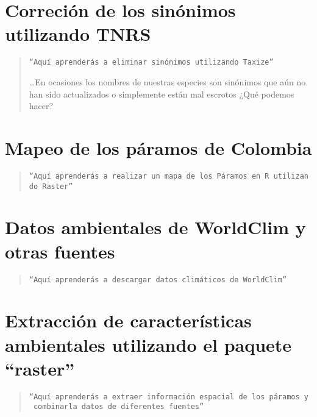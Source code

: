 \documentclass[
]{book}
\begin{document}
\hypertarget{correciuxf3n-de-los-sinuxf3nimos-utilizando-tnrs}{%
\section{Correción de los sinónimos utilizando TNRS}\label{correciuxf3n-de-los-sinuxf3nimos-utilizando-tnrs}}

\begin{quote}
\texttt{“Aquí\ aprenderás\ a\ eliminar\ sinónimos\ utilizando\ Taxize”}

\ldots En ocasiones los nombres de nuestras especies son sinónimos que aún no han sido actualizados o simplemente están mal escrotos ¿Qué podemos hacer?
\end{quote}

\hypertarget{mapeo-de-los-puxe1ramos-de-colombia}{%
\section{Mapeo de los páramos de Colombia}\label{mapeo-de-los-puxe1ramos-de-colombia}}

\begin{quote}
\texttt{“Aquí\ aprenderás\ a\ realizar\ un\ mapa\ de\ los\ Páramos\ en\ R\ utilizando\ Raster”}
\end{quote}

\hypertarget{datos-ambientales-de-worldclim-y-otras-fuentes}{%
\section{Datos ambientales de WorldClim y otras fuentes}\label{datos-ambientales-de-worldclim-y-otras-fuentes}}

\begin{quote}
\texttt{“Aquí\ aprenderás\ a\ descargar\ datos\ climáticos\ de\ WorldClim”}
\end{quote}

\hypertarget{extracciuxf3n-de-caracteruxedsticas-ambientales-utilizando-el-paquete-raster}{%
\section{Extracción de características ambientales utilizando el paquete ``raster''}\label{extracciuxf3n-de-caracteruxedsticas-ambientales-utilizando-el-paquete-raster}}

\begin{quote}
\texttt{“Aquí\ aprenderás\ a\ extraer\ información\ espacial\ de\ los\ páramos\ y\ combinarla\ datos\ de\ diferentes\ fuentes”}
\end{quote}
\end{document}
